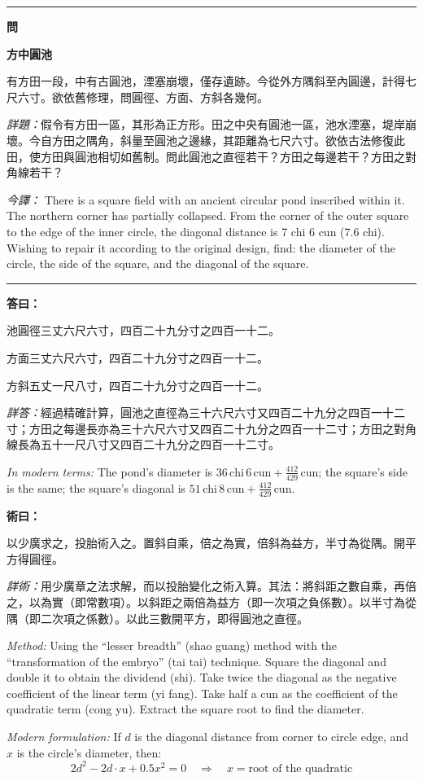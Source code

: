 \documentclass[11pt,a4paper]{article}
\newenvironment{problem}[1][]{%
  \medskip\noindent\rule{\textwidth}{0.4pt}%
  \par\noindent\textbf{\color{sectioncolor}#1}\par\nopagebreak%
  \smallskip%
}{%
  \par\noindent\rule{\textwidth}{0.4pt}\medskip%
}
\newenvironment{answer}{%
  \medskip\noindent{\color{answercolor}\rule{0.5\textwidth}{0.5pt}}%
  \par\color{answercolor}%
}{%
  \par\medskip%
}
\newenvironment{method}{%
  \medskip\noindent{\color{methodcolor}\rule{0.5\textwidth}{0.5pt}}%
  \par\color{methodcolor}%
}{%
  \par\medskip%
}
\begin{document}
\begin{problem}[\textbf{問}]
\textbf{\color{sectioncolor}方中圓池}

有方田一段，中有古圓池，湮塞崩壞，僅存遺跡。今從外方隅斜至內圓邊，計得七尺六寸。欲依舊修理，問圓徑、方面、方斜各幾何。

\medskip
\textit{詳題：}假令有方田一區，其形為正方形。田之中央有圓池一區，池水湮塞，堤岸崩壞。今自方田之隅角，斜量至圓池之邊緣，其距離為七尺六寸。欲依古法修復此田，使方田與圓池相切如舊制。問此圓池之直徑若干？方田之每邊若干？方田之對角線若干？

\medskip
\textit{今譯：} There is a square field with an ancient circular pond inscribed within it. The northern corner has partially collapsed. From the corner of the outer square to the edge of the inner circle, the diagonal distance is 7 chi 6 cun (7.6 chi). Wishing to repair it according to the original design, find: the diameter of the circle, the side of the square, and the diagonal of the square.
\end{problem}

\begin{answer}
\textbf{答曰：}

池圓徑三丈六尺六寸，四百二十九分寸之四百一十二。

方面三丈六尺六寸，四百二十九分寸之四百一十二。

方斜五丈一尺八寸，四百二十九分寸之四百一十二。

\medskip
\textit{詳答：}經過精確計算，圓池之直徑為三十六尺六寸又四百二十九分之四百一十二寸；方田之每邊長亦為三十六尺六寸又四百二十九分之四百一十二寸；方田之對角線長為五十一尺八寸又四百二十九分之四百一十二寸。

\medskip
\textit{In modern terms:} The pond's diameter is $36\,\text{chi}\,6\,\text{cun} + \frac{412}{429}\,\text{cun}$; the square's side is the same; the square's diagonal is $51\,\text{chi}\,8\,\text{cun} + \frac{412}{429}\,\text{cun}$.
\end{answer}

\begin{method}
\textbf{術曰：}

以少廣求之，投胎術入之。置斜自乘，倍之為實，倍斜為益方，半寸為從隅。開平方得圓徑。

\medskip
\textit{詳術：}用少廣章之法求解，而以投胎變化之術入算。其法：將斜距之數自乘，再倍之，以為實（即常數項）。以斜距之兩倍為益方（即一次項之負係數）。以半寸為從隅（即二次項之係數）。以此三數開平方，即得圓池之直徑。

\medskip
\textit{Method:} Using the ``lesser breadth'' (shao guang) method with the ``transformation of the embryo'' (tai tai) technique. Square the diagonal and double it to obtain the dividend (shi). Take twice the diagonal as the negative coefficient of the linear term (yi fang). Take half a cun as the coefficient of the quadratic term (cong yu). Extract the square root to find the diameter.

\medskip
\textit{Modern formulation:} If $d$ is the diagonal distance from corner to circle edge, and $x$ is the circle's diameter, then:
\[
2d^2 - 2d \cdot x + 0.5 x^2 = 0 \quad\Rightarrow\quad x = \text{root of the quadratic}
\]
\end{method}
\end{document}
